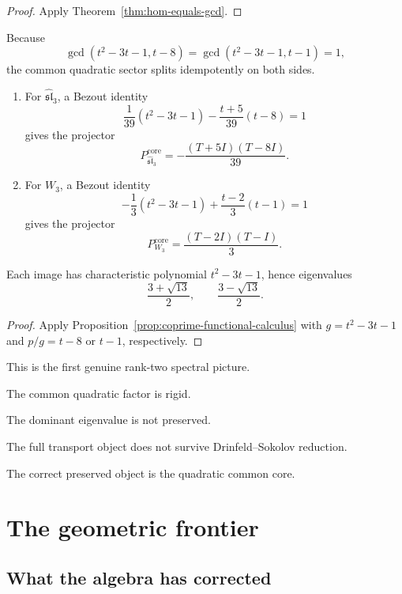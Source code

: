 \begin{proof}
Apply Theorem~\ref{thm:hom-equals-gcd}.
\end{proof}

\begin{proposition}
\ClaimStatusProvedHere
\label{prop:explicit-sl3-projectors}
Because
\[
\gcd(t^2-3t-1,t-8)=\gcd(t^2-3t-1,t-1)=1,
\]
the common quadratic sector splits idempotently on both sides.

\begin{enumerate}[label=\textup{(\roman*)}]
\item For \(\widehat{\mathfrak{sl}}_3\), a Bezout identity
\[
\frac1{39}(t^2-3t-1)-\frac{t+5}{39}(t-8)=1
\]
gives the projector
\[
P^{\mathrm{core}}_{\widehat{\mathfrak{sl}}_3}
=
-\frac{(T+5I)(T-8I)}{39}.
\]

\item For \(W_3\), a Bezout identity
\[
-\frac13(t^2-3t-1)+\frac{t-2}{3}(t-1)=1
\]
gives the projector
\[
P^{\mathrm{core}}_{W_3}
=
\frac{(T-2I)(T-I)}{3}.
\]
\end{enumerate}

Each image has characteristic polynomial \(t^2-3t-1\), hence eigenvalues
\[
\frac{3+\sqrt{13}}2,\qquad \frac{3-\sqrt{13}}2.
\]
\end{proposition}

\begin{proof}
Apply Proposition~\ref{prop:coprime-functional-calculus} with \(g=t^2-3t-1\) and \(p/g=t-8\) or \(t-1\), respectively.
\end{proof}

\begin{remark}
This is the first genuine rank-two spectral picture.

The common quadratic factor is rigid.

The dominant eigenvalue is not preserved.

The full transport object does not survive Drinfeld--Sokolov reduction.

The correct preserved object is the quadratic common core.
\end{remark}

\section{The geometric frontier}

\subsection{What the algebra has corrected}

